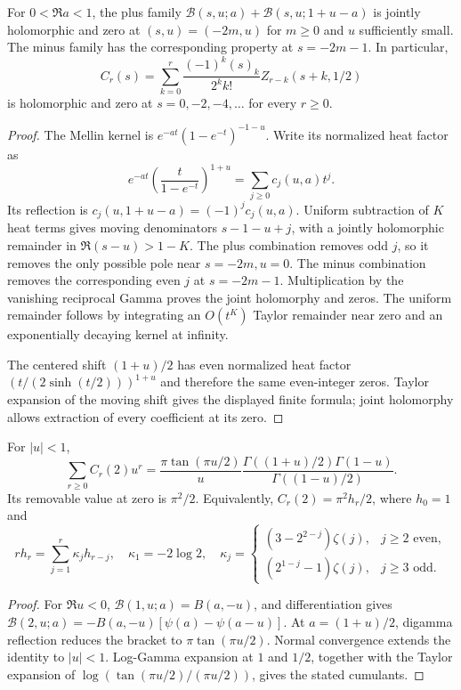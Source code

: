 \begin{theorem}
\label{agrc-add:reflection}
For $0<\Re a<1$, the plus family
$\mathcal B(s,u;a)+\mathcal B(s,u;1+u-a)$ is jointly holomorphic and
zero at $(s,u)=(-2m,u)$ for $m\geq0$ and $u$ sufficiently small.
The minus family has the corresponding property at $s=-2m-1$.
In particular,
\[
 C_r(s)=\sum_{k=0}^r\frac{(-1)^k(s)_k}{2^k k!}
                          Z_{r-k}(s+k,1/2)
\]
is holomorphic and zero at $s=0,-2,-4,\ldots$ for every $r\geq0$.
\end{theorem}
\begin{proof}
The Mellin kernel is $e^{-at}(1-e^{-t})^{-1-u}$.
Write its normalized heat factor as
\[
 e^{-at}\left(\frac{t}{1-e^{-t}}\right)^{1+u}
      =\sum_{j\geq0}c_j(u,a)t^j.
\]
Its reflection is $c_j(u,1+u-a)=(-1)^jc_j(u,a)$.
Uniform subtraction of $K$ heat terms gives moving denominators
$s-1-u+j$, with a jointly holomorphic remainder in
$\Re(s-u)>1-K$. The plus combination removes odd $j$, so it removes
the only possible pole near $s=-2m,u=0$. The minus combination removes
the corresponding even $j$ at $s=-2m-1$. Multiplication by the vanishing
reciprocal Gamma proves the joint holomorphy and zeros. The uniform
remainder follows by integrating an $O(t^K)$ Taylor remainder near zero
and an exponentially decaying kernel at infinity.

The centered shift $(1+u)/2$ has even normalized heat factor
$(t/(2\sinh(t/2)))^{1+u}$ and therefore the same even-integer zeros.
Taylor expansion of the moving shift gives the displayed finite formula;
joint holomorphy allows extraction of every coefficient at its zero.
\end{proof}

\begin{corollary}
\label{agrc-add:Gamma}
For $|u|<1$,
\[
 \sum_{r\geq0}C_r(2)u^r
 =\frac{\pi\tan(\pi u/2)}{u}
       \frac{\Gamma((1+u)/2)\Gamma(1-u)}{\Gamma((1-u)/2)}.
\]
Its removable value at zero is $\pi^2/2$. Equivalently,
$C_r(2)=\pi^2h_r/2$, where $h_0=1$ and
\[
 rh_r=\sum_{j=1}^r\kappa_jh_{r-j},\quad
 \kappa_1=-2\log2,\quad
 \kappa_j=\begin{cases}
 (3-2^{2-j})\zeta(j),&j\geq2\text{ even},\\
 (2^{1-j}-1)\zeta(j),&j\geq3\text{ odd}.
 \end{cases}
\]
\end{corollary}
\begin{proof}
For $\Re u<0$, $\mathcal B(1,u;a)=B(a,-u)$, and differentiation gives
$\mathcal B(2,u;a)=-B(a,-u)[\psi(a)-\psi(a-u)]$.
At $a=(1+u)/2$, digamma reflection reduces the bracket to
$\pi\tan(\pi u/2)$. Normal convergence extends the identity to $|u|<1$.
Log-Gamma expansion at $1$ and $1/2$, together with the Taylor expansion
of $\log(\tan(\pi u/2)/(\pi u/2))$, gives the stated cumulants.
\end{proof}

